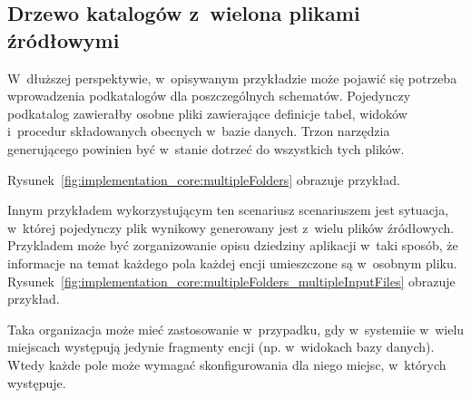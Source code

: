 


\subsection{Drzewo katalogów z~wielona plikami źródłowymi}

W~dłuższej perspektywie, w~opisywanym przykładzie może pojawić się potrzeba wprowadzenia podkatalogów dla poszczególnych schematów.
Pojedynczy podkatalog zawierałby osobne pliki zawierające definicje tabel, widoków i~procedur składowanych obecnych w~bazie danych.
Trzon narzędzia generującego powinien być w~stanie dotrzeć do wszystkich tych plików.

Rysunek~\ref{fig:implementation_core:multipleFolders} obrazuje przykład.



Innym przykładem wykorzystującym ten scenariusz scenariuszem jest sytuacja, w~której pojedynczy plik wynikowy generowany jest z~wielu plików źródłowych.
Przykladem może być zorganizowanie opisu dziedziny aplikacji w~taki sposób, że informacje na temat każdego pola każdej encji umieszczone są w~osobnym pliku.
Rysunek~\ref{fig:implementation_core:multipleFolders_multipleInputFiles} obrazuje przykład.



Taka organizacja może mieć zastosowanie w~przypadku, gdy w~systemiie w~wielu miejscach występują jedynie fragmenty encji (np. w~widokach bazy danych).
Wtedy każde pole może wymagać skonfigurowania dla niego miejsc, w~których występuje.

